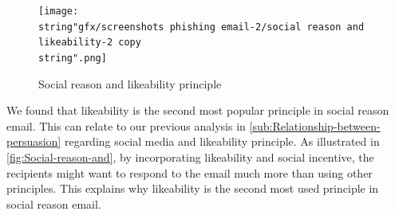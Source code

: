 \begin{figure}[h]
\centering{}\texttt{[image: \\string"gfx/screenshots phishing email-2/social reason and likeability-2 copy\\string".png]}\protect\caption{\label{fig:Social-reason-and}Social reason and likeability principle}
\end{figure}


We found that likeability is the second most popular principle in
social reason email. This can relate to our previous analysis in \autoref{sub:Relationship-between-persuasion}
regarding social media and likeability principle. As illustrated in
\autoref{fig:Social-reason-and}, by incorporating likeability and
social incentive, the recipients might want to respond to the email
much more than using other principles. This explains why likeability
is the second most used principle in social reason email.

